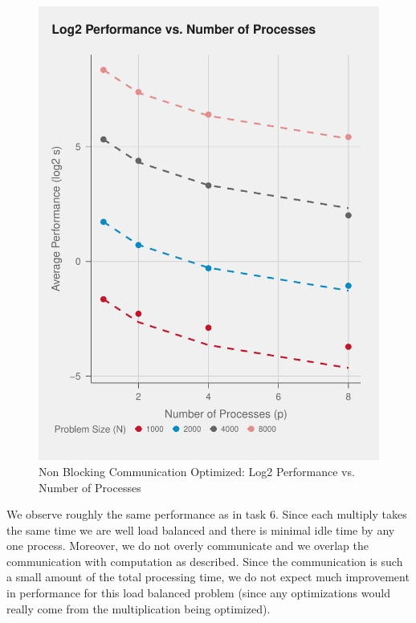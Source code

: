 \documentclass{article}
\begin{document}
\begin{figure}[H]
    \centering
    \includegraphics[scale=0.6]{../part2/out/np-7.pdf} 
    \caption{Non Blocking Communication Optimized: Log2 Performance vs. Number of Processes}
 \end{figure}
\noindent We observe roughly the same performance as in task 6. Since each multiply takes the same 
time we are well load balanced and there is minimal idle time by any one process. Moreover, 
we do not overly communicate and we overlap the communication with computation as described. 
Since the communication is such a small amount of the total processing time, we do not expect 
much improvement in performance for this load balanced problem (since any optimizations 
would really come from the multiplication being optimized).
\end{document}
